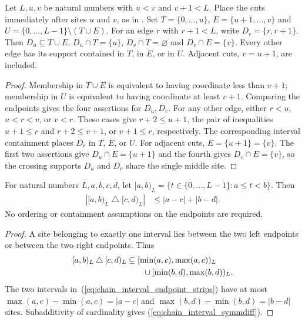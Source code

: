 \begin{lemma}
    \label{thm:chain_two_cut_edge_supports}
    \leanok
    Let $L,u,v$ be natural numbers with $u<v$ and $v+1<L$.
    Place the cuts immediately after sites $u$ and $v$, as in
    \cite{Arad2016RigorousRG}. Set $T=\{0,\ldots,u\}$, $E=\{u+1,\ldots,v\}$
    and $U=\{0,\ldots,L-1\}\setminus(T\cup E)$.
    For an edge $r$ with $r+1<L$, write $D_r=\{r,r+1\}$.
    Then $D_u\subseteq T\cup E$, $D_u\cap T=\{u\}$,
    $D_v\cap T=\varnothing$ and $D_v\cap E=\{v\}$.
    Every other edge has its support contained in $T$, in $E$, or in $U$.
    Adjacent cuts, $v=u+1$, are included.
\end{lemma}
\begin{proof}\leanok
    Membership in $T\cup E$ is equivalent to having coordinate less than
    $v+1$; membership in $U$ is equivalent to having coordinate at least
    $v+1$. Comparing the endpoints gives the four assertions for $D_u,D_v$.
    For any other edge, either $r<u$, $u<r<v$, or $v<r$.
    These cases give $r+2\le u+1$, the pair of inequalities
    $u+1\le r$ and $r+2\le v+1$, or $v+1\le r$, respectively.
    The corresponding interval containment places $D_r$ in $T$, $E$, or $U$.
    For adjacent cuts, $E=\{u+1\}=\{v\}$. The first two assertions give
    $D_u\cap E=\{u+1\}$ and the fourth gives $D_v\cap E=\{v\}$, so the
    crossing supports $D_u$ and $D_v$ share the single middle site.
\end{proof}

\begin{lemma}
    \label{thm:chain_interval_symmdiff}
    \leanok
    For natural numbers $L,a,b,c,d$, let
    $[a,b)_L=\{t\in\{0,\ldots,L-1\}:a\le t<b\}$.
    Then
    \begin{align}
        |{\lbrack a,b)_L}\mathbin{\triangle}{\lbrack c,d)_L}| & \le |a-c|+|b-d|.
        \label{eq:chain_interval_symmdiff}
    \end{align}
    No ordering or containment assumptions on the endpoints are required.
\end{lemma}
\begin{proof}\leanok
    A site belonging to exactly one interval lies between the two left
    endpoints or between the two right endpoints. Thus
    \begin{align}
        {\lbrack a,b)_L}\mathbin{\triangle}{\lbrack c,d)_L}
         & \subseteq [\min(a,c),\max(a,c))_L\notag \\
         & \qquad\cup [\min(b,d),\max(b,d))_L.
        \label{eq:chain_interval_endpoint_strips}
    \end{align}
    The two intervals in~(\ref{eq:chain_interval_endpoint_strips}) have at
    most $\max(a,c)-\min(a,c)=|a-c|$ and
    $\max(b,d)-\min(b,d)=|b-d|$ sites. Subadditivity of cardinality gives
    (\ref{eq:chain_interval_symmdiff}).
\end{proof}

